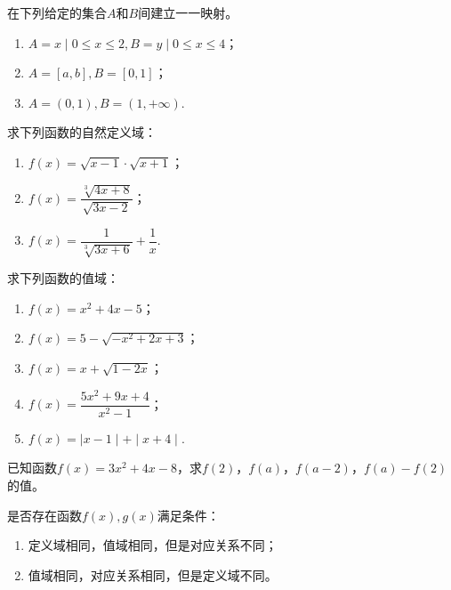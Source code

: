 \documentclass[lang=cn,math=cm,chinesefont=nofont,11pt,scheme=chinese,twocol]{elegantbook}
\begin{document}
\begin{exercise}
  在下列给定的集合$A$和$B$间建立一一映射。
\end{exercise}

\begin{enumerate}
  \item $A={x\mid 0\leqslant x\leqslant 2},B={y\mid 0\leqslant x\leqslant 4}$；
  \item $A=[a,b],B=[0,1]$；
  \item $A=(0,1),B=(1,+\infty)$.
\end{enumerate}

\begin{exercise}
  求下列函数的自然定义域：
\end{exercise}

\begin{spacing}{1.8}
  \begin{enumerate}
  \item $f(x)=\sqrt{x-1}\cdot\sqrt{x+1}$；
  \item $f(x)=\dfrac{\sqrt[3]{4x+8}}{\sqrt{3x-2}}$；
  \item $f(x)=\dfrac1{\sqrt[3]{3x+6}}+\dfrac1x$.
  \end{enumerate}
\end{spacing}

\begin{exercise}
  求下列函数的值域：
\end{exercise}

\begin{enumerate}
  \item $f(x)=x^2+4x-5$；
  \item $f(x)=5-\sqrt{-x^{2}+2x+3}$；
  \item $f(x)=x+\sqrt{1-2x}$；
  \item \begin{spacing}{1.8}$f(x)=\dfrac{5x^{2}+9x+4}{x^{2}-1}$；\end{spacing}
  \item $f(x)=\mid x-1\mid+\mid x+4\mid $.
\end{enumerate}

\begin{exercise}
  已知函数$f(x)=3x^2+4x-8$，求$f(2)$，$f(a)$，$f(a-2)$，$f(a)-f(2)$的值。
\end{exercise}

\begin{exercise}\label{2017RJA.P74.17}
  是否存在函数$f(x),g(x)$满足条件：
\end{exercise}

\begin{enumerate}
  \item 定义域相同，值域相同，但是对应关系不同；
  \item 值域相同，对应关系相同，但是定义域不同。
\end{enumerate}
\end{document}
